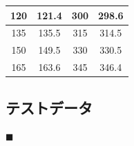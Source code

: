 \documentclass[twocolumn,a4j]{jsarticle}
\begin{document}
\begin{table}[htbp]
\begin{center}
\begin{tabular}{|p{20mm}|p{20mm}|p{20mm}|p{20mm}|}
            \multicolumn{1}{|c|}{120}                   & \multicolumn{1}{|c|}{121.4}                & \multicolumn{1}{|c|}{300}                   & \multicolumn{1}{|c|}{298.6}  \\ \hline
            \multicolumn{1}{|c|}{135}                   & \multicolumn{1}{|c|}{135.5}                & \multicolumn{1}{|c|}{315}                   & \multicolumn{1}{|c|}{314.5}  \\ \hline
            \multicolumn{1}{|c|}{150}                   & \multicolumn{1}{|c|}{149.5}                & \multicolumn{1}{|c|}{330}                   & \multicolumn{1}{|c|}{330.5}  \\ \hline
            \multicolumn{1}{|c|}{165}                   & \multicolumn{1}{|c|}{163.6}                & \multicolumn{1}{|c|}{345}                   & \multicolumn{1}{|c|}{346.4}  \\ \hline
        \end{tabular}
    \end{center}
\end{table}


\newpage

\subsection{テストデータ}

$\blacksquare$ 
\end{document}
